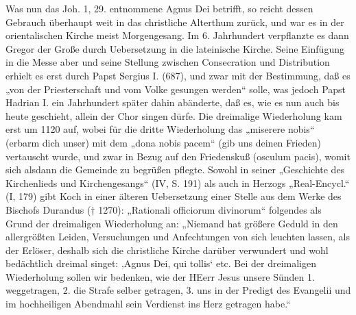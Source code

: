 Was nun das Joh. 1, 29. entnommene Agnus Dei betrifft, so reicht dessen Gebrauch überhaupt weit in das christliche Alterthum zurück, und war es in der orientalischen Kirche meist Morgengesang. Im 6. Jahrhundert verpflanzte es dann Gregor der Große durch Uebersetzung in die lateinische Kirche. Seine Einfügung in die Messe aber und seine Stellung zwischen Consecration und Distribution erhielt es erst durch Papst Sergius I. (687), und zwar mit der Bestimmung, daß es „von der Priesterschaft und vom Volke gesungen werden“ solle, was jedoch Papst Hadrian I. ein Jahrhundert später dahin abänderte, daß es, wie es nun auch bis heute geschieht, allein der Chor singen dürfe. Die dreimalige Wiederholung kam erst um 1120 auf, wobei für die dritte Wiederholung das „miserere nobis“ (erbarm dich unser) mit dem „dona nobis pacem“ (gib uns deinen Frieden) vertauscht wurde, und zwar in Bezug auf den Friedenskuß (osculum pacis), womit sich alsdann die Gemeinde zu begrüßen pflegte. Sowohl in seiner „Geschichte des Kirchenlieds und Kirchengesangs“ (IV, S. 191) als auch in Herzogs „Real-Encycl.“ (I, 179) gibt Koch in einer älteren Uebersetzung einer Stelle aus dem Werke des Bischofs Durandus († 1270): „Rationali officiorum divinorum“ folgendes als Grund der dreimaligen Wiederholung an: „Niemand hat größere Geduld in den allergrößten Leiden, Versuchungen und Anfechtungen von sich leuchten lassen, als der Erlöser, deshalb sich die christliche Kirche darüber verwundert und wohl bedächtlich dreimal singet: ‚Agnus Dei, qui tollis‘ etc. Bei der dreimaligen Wiederholung sollen wir bedenken, wie der HEerr Jesus unsere Sünden 1. weggetragen, 2. die Strafe selber getragen, 3. uns in der Predigt des Evangelii und im hochheiligen Abendmahl sein Verdienst ins Herz getragen habe.“

